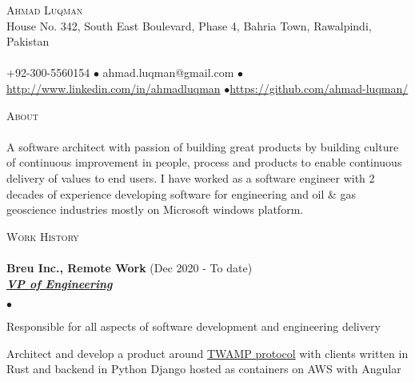 \documentclass{article}
\newcommand{\lineunder}{\vspace*{-8pt} \\ \hspace*{-18pt} \hrulefill \\}
\newcommand{\header}[1]{{\hspace*{-15pt}\vspace*{6pt} \textsc{#1}} \vspace*{-6pt} \lineunder}
\newcommand{\employer}[3]{{ \textbf{#1} (#2)\\ \underline{\textbf{\emph{#3}}}\\  }}
\newcommand{\contact}[3]{
\vspace*{-8pt}
\begin{center}
{\LARGE \scshape {#1}}\\
#2 \lineunder 
#3
\end{center}
\vspace*{-8pt}
}
\newenvironment{achievements}{\begin{list}{$\bullet$}{\topsep 0pt \itemsep -2pt}}{\vspace*{4pt}\end{list}}
\begin{document}
\small
\smallskip
\vspace*{-44pt}

\contact{Ahmad Luqman}
{House No. 342, South East Boulevard, Phase 4, Bahria Town, Rawalpindi, Pakistan}
{+92-300-5560154 $\bullet$ ahmad.luqman@gmail.com  $\bullet$\url{http://www.linkedin.com/in/ahmadluqman} $\bullet$\url{https://github.com/ahmad-luqman/}}

\header{About}
A software architect with passion of building great products by building culture of continuous improvement in people, process and products to enable continuous delivery of values to end users. I have worked as a software engineer with 2 decades of experience developing software for engineering and oil \& gas geoscience industries mostly on Microsoft windows platform.
\vspace*{6pt}

\header{Work History}
\employer{Breu Inc., Remote Work}{Dec 2020 - To date}{VP of Engineering}
	\begin{achievements}
	\item Responsible for all aspects of software development and engineering delivery
	\item Architect and develop a product around \href{https://tools.ietf.org/html/rfc5357}{TWAMP protocol} with clients written in Rust and backend in Python Django hosted as containers on AWS with Angular 
	\end{achievements}
\end{document}

